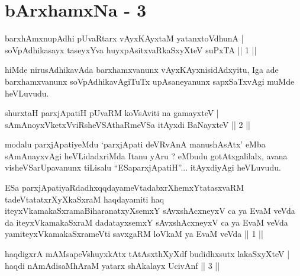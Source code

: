 
\chapter{bArxhamxNa - 3}
 \begin{shl}
barxhAmxnupAdhi pUvaRtarx vAyxKAyxtaM yatanxtoV\s dhunA | \\
soVpAdhikasayx taseyxYva huyxpAsitxvaRkaSxyXteV suPxTA \hfill ||  1 || 
\end{shl}

\begin{artha}
hiMde nirusAdhikavAda barxhamxvanunx vAyxKAyxnisidAdxyitu, Iga ade barxhamxvanunx soVpAdhikavAgiTuTx upAsaneyanunx sapxSaTxvAgi muMde heVLuvudu.
\end{artha}

\begin{shl}
shurxtaH parxjApatiH pUvaRM koV\s sAviti na gamayxteV | \\
sAmAnoyxVketxVviRsheVSAthaRmeVSa itAyxdi BaNayxteV \hfill ||  2 || 
\end{shl}	

\begin{artha}
modalu parxjApatiyeMdu `parxjApati deVRvAnA manushAsAtx' eMba sAmAnayxvAgi heVLidadxriMda Itanu yAru ? eMbudu gotAtxgalilalx, avana visheVSarUpavanunx tiLisalu ``ESaparxjApatiH''... itAyxdiyAgi heVLuvudu.
\end{artha}

\begin{kandikeshl}
ESa parxjApatiyaRdadhxqqdayameVtadabxrXhemxYtatasxvaRM tadeVtatatxrXyXkaSxraM haqdayamiti haq iteyxVkamakaSxramaBiharanatxyXsemxY sAvxshAcxneyxV ca ya EvaM veVda da iteyxVkamakaSxraM dadatayxsemxY sAvxshAcxneyxV ca ya EvaM veVda yamiteyxVkamakaSxrameVti savxgaRM loVkaM ya EvaM veVda || 1 ||
\end{kandikeshl}


\begin{shl}
haqdigxrA mAMsapeVshuyxkAtx tAtAsxthXyXdf budidhxsutx lakaSxyXteV | \\
haqdi nAmAdisaMhAraM yatarx shAkalayx UcivAnf \hfill ||  3 || 
\end{shl}

